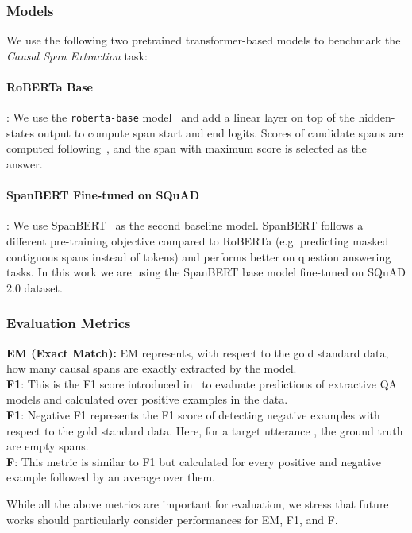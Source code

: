 \documentclass[11pt,a4paper]{article}
\theoremstyle{definition}
\newcommand\code[1]{\texttt{#1}}
\begin{document}
\subsubsection{Models}
We use the following two pretrained transformer-based models to benchmark the \textit{Causal Span Extraction} task:
\paragraph{RoBERTa Base}: We use the \code{roberta-base}
model~\cite{liu2019roberta} and add a linear layer on top of the hidden-states output to compute span start and end logits. Scores of candidate spans are computed following~\citet{devlin2018bert}, and the span with maximum score is selected as the answer.




\paragraph{SpanBERT Fine-tuned on SQuAD}: We use SpanBERT~\citep{joshi2020spanbert} as the second baseline model. 
SpanBERT follows a different pre-training objective compared to RoBERTa (e.g. predicting masked contiguous spans instead of tokens) and performs better on question answering tasks. 
In this work we are using the SpanBERT base model fine-tuned on SQuAD 2.0 dataset.




\subsubsection{Evaluation Metrics}
\label{sec:metric}


\noindent \textbf{EM (Exact Match):} EM represents, with respect to the gold standard data, how many causal spans are exactly extracted by the model.\\
\textbf{F1}: This is the F1 score introduced in~\cite{rajpurkar2016squad} to evaluate predictions of extractive QA models and calculated over positive examples in the data.\\ 
\textbf{F1}: Negative F1 represents the F1 score of detecting negative examples with respect to the gold standard data. Here, for a target utterance , the ground truth are empty spans.\\
\textbf{F}: This metric is similar to F1 but calculated for every positive and negative example followed by an average over them.


While all the above metrics are important for evaluation, we stress that future works should 
particularly consider performances for EM, F1, and F.
\end{document}
